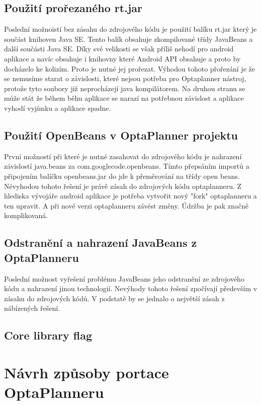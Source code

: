 \subsection{Použití prořezaného rt.jar}
Poslední možnoistí bez zásahu do zdrojového kódu je použití balíku rt.jar který je součást knihoven Java SE. Tento balík obsahuje zkompilované třídy JavaBeans a další součásti Java SE. Díky své velikosti se však příliš nehodí pro android aplikace a navíc obsahuje i knihovny které Android API obsahuje a proto by docházelo ke kolizím. Proto je nutné jej prořezat. Výhodou tohoto přořezání je že se nemusíme starat o závislosti, které nejsou potřeba pro Optaplanner nástroj, protože tyto soubory již neprocházejí java kompilátorem. Na druhou stranu se může stát že během běhu aplikace se narazí na potřebnou závislost a aplikace vyhodí vyjímku a aplikace spadne.

\subsection{Použití OpenBeans v OptaPlanner projektu}
První možností při které je nutné zasahovat do zdrojového kódu je nahrazení závislostí java.beans za com.googlecode.openbeans. Tímto přepsáním importů a připojením balíčku openbeans.jar do jde k přeměrování na třídy open beans. Névyhodou tohoto řešení je právě zásah do zdrojových kódu optaplanneru. Z hlediska vývojáře android aplikace je potřeba vytvořit nový "fork" optaplanneru a ten upravit. A při nové verzi optaplanneru závést změny. Údržba je pak značně komplikovaná.

\subsection{Odstranění a nahrazení JavaBeans z OptaPlanneru}
Poslední možnost vyřešení problému JavaBeans jeho odstranění ze zdrojového kódu a nahrazení jinou technologií. Nevýhody tohoto řešení zpočívají především v zásahu do zdrojových kódů. V podstatě by se jednalo o největší zásah z nábízených řešení. 







\subsection{Core library flag}

\section{Návrh způsoby portace OptaPlanneru}
\subsection{}



